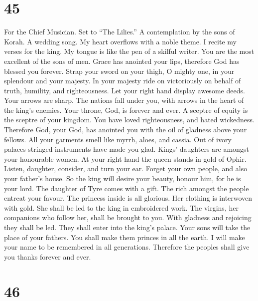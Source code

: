 \hypertarget{section-44}{%
\section{45}\label{section-44}}

For the Chief Musician. Set to ``The Lilies.'' A contemplation by the
sons of Korah. A wedding song.  My heart overflows with a
noble theme. I recite my verses for the king. My tongue is like the pen
of a skilful writer.  You are the most excellent of the
sons of men. Grace has anointed your lips, therefore God has blessed you
forever.  Strap your sword on your thigh, O mighty one, in
your splendour and your majesty.  In your majesty ride on
victoriously on behalf of truth, humility, and righteousness. Let your
right hand display awesome deeds.  Your arrows are sharp.
The nations fall under you, with arrows in the heart of the king's
enemies.  Your throne, God, is forever and ever. A sceptre
of equity is the sceptre of your kingdom.  You have loved
righteousness, and hated wickedness. Therefore God, your God, has
anointed you with the oil of gladness above your fellows. 
All your garments smell like myrrh, aloes, and cassia. Out of ivory
palaces stringed instruments have made you glad.  Kings'
daughters are amongst your honourable women. At your right hand the
queen stands in gold of Ophir.  Listen, daughter,
consider, and turn your ear. Forget your own people, and also your
father's house.  So the king will desire your beauty,
honour him, for he is your lord.  The daughter of Tyre
comes with a gift. The rich amongst the people entreat your favour.
 The princess inside is all glorious. Her clothing is
interwoven with gold.  She shall be led to the king in
embroidered work. The virgins, her companions who follow her, shall be
brought to you.  With gladness and rejoicing they shall
be led. They shall enter into the king's palace.  Your
sons will take the place of your fathers. You shall make them princes in
all the earth.  I will make your name to be remembered in
all generations. Therefore the peoples shall give you thanks forever and
ever.

\hypertarget{section-45}{%
\section{46}\label{section-45}}

